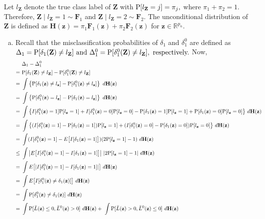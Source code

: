 \documentclass[twoside]{article}
\newcommand{\bZ}{\mathbf{Z}}
\newcommand{\bF}{\mathbf{F}}
\newcommand{\bH}{\mathbf{H}}
\newcommand{\bz}{\mathbf{z}}
\newcommand{\0}{\mathbf{0}}
\newcommand{\1}{\mathbf{1}}
\numberwithin{equation}{section}
\begin{document}
Let $l_{\bZ}$ denote the true class label of $\bZ$ with ${\rm P}[l_{\bZ}=j]=\pi_j,$ where $\pi_1+\pi_2=1.$ Therefore, $\bZ\mid l_{\bZ}=1\sim\bF_1$ and $\bZ\mid l_{\bZ}=2\sim\bF_2.$ The unconditional distribution of $\bZ$ is defined as $\bH(\bz)=\pi_1\bF_1(\bz)+\pi_2\bF_2(\bz)$ for $ \bz\in\mathbb{R}^{p_n}.$
\begin{enumerate}[(a)]
\item Recall that the misclassification probabilities of $\delta_{1}$ and $\delta^0_{1}$ are defined as $\Delta_1 = {\rm P}[\delta_{1}(\bZ)\neq l_{\bZ}]\text{ and } \Delta^0_{1} = {\rm P}[\delta^0_{1}(\bZ)\neq l_{\bZ}],\text{ respectively.}$ Now,
\begin{align}\label{nref11}
    &\ \Delta_{1} - \Delta^0_{1}\nonumber \\
    =&\ {\rm P}[\delta_1(\bZ)\neq l_{\bZ}]- {\rm P}[\delta^0_{1}(\bZ)\neq l_{\bZ}]\nonumber\\
    =&\ \int \left \{{\rm P}[\delta_1(\bz)\neq l_{\bz}]- {\rm P}[\delta^0_{1}(\bz)\neq l_{\bz}]\right \}\ d\bH(\bz)\nonumber\\
    =&\ \int \left \{{\rm P}[\delta^0_{1}(\bz)= l_{\bz}]- {\rm P}[\delta_1(\bz)= l_{\bz}]\right\}\ d\bH(\bz)\nonumber\\
    =&\ \int \big \{I[\delta^0_{1}(\bz)=1]{\rm P}[ l_{\bz}=1] + I[\delta^0_{1}(\bz)=0]{\rm P}[ l_{\bz}=0]-{\rm P}[\delta_1(\bz)=1]{\rm P}[ l_{\bz}=1] + {\rm P}[\delta_1(\bz)=0]{\rm P}[ l_{\bz}=0]\big \}\ d\bH(\bz)\nonumber\\
    =&\ \int \big \{(I[\delta^0_{1}(\bz)=1] - {\rm P}[\delta_1(\bz)=1]){\rm P}[ l_{\bz}=1] + (I[\delta^0_{1}(\bz)=0] - {\rm P}[\delta_1(\bz)=0]){\rm P}[ l_{\bz}=0]\big \}\ d\bH(\bz)\nonumber\\
    =&\ \int (I[\delta^0_{1}(\bz)=1] - E\big [I[\delta_1(\bz)=1]\big ])(2{\rm P}[ l_{\bz}=1]-1)\ d\bH(\bz)\nonumber\\
    \leq &\ \int \big |E\big [I[\delta^0_{1}(\bz)=1] - I[\delta_1(\bz)=1]\big ]\big |\ |2{\rm P}[ l_{\bz}=1]-1|\ d\bH(\bz)\nonumber\\
    = &\ \int E\big [|I[\delta^0_{1}(\bz)=1] - I[\delta_1(\bz)=1]|\big ]\ d\bH(\bz)\nonumber\\
    = &\ \int E\big [I[\delta^0_{1}(\bz)\neq \delta_1(\bz)]\big ]\ d\bH(\bz)\nonumber\\
    = &\ \int {\rm P}[\delta^0_{1}(\bz)\neq \delta_1(\bz)]\ d\bH(\bz)\nonumber\\
    = &\ \int {\rm P}[\bar{L}(\bz)\leq 0,\bar{L}^0(\bz)> 0]\ d\bH(\bz)+\ \int {\rm P}[\bar{L}(\bz)> 0,\bar{L}^0(\bz)\leq 0]\ d\bH(\bz)\nonumber \\

\end{align}
\end{enumerate}
\end{document}

